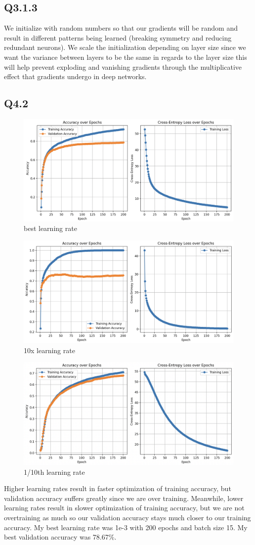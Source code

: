 \documentclass{article}
\begin{document}
\subsection*{Q3.1.3}
\begin{flushleft}
    We initialize with random numbers so that our gradients will be random and 
    result in different patterns being learned (breaking symmetry and reducing 
    redundant neurons). We scale the initialization 
    depending on layer size since we want the variance between layers to be the 
    same in regards to the layer size this will help prevent exploding and vanishing 
    gradients through the multiplicative effect that gradients undergo in deep 
    networks.
\end{flushleft}
\newpage
\subsection*{Q4.2}
\begin{figure}[htbp]
    \centering
    \includegraphics[width=0.4\linewidth]{best_lr.png}
    \caption{best learning rate}
  \end{figure}
  
  \begin{figure}[htbp]
    \centering
    \includegraphics[width=0.4\linewidth]{10x_lr.png}
    \caption{10x learning rate}
  \end{figure}
  
  \begin{figure}[htbp]
    \centering
    \includegraphics[width=0.4\linewidth]{tenth_lr.png}
    \caption{1/10th learning rate}
  \end{figure}
  Higher learning rates result in faster optimization of training accuracy,
  but validation accuracy suffers greatly since we are over training. Meanwhile,
  lower learning rates result in slower optimization of training accuracy,
  but we are not overtraining as much so our validation accuracy stays much closer 
  to our training accuracy. My best learning rate was 1e-3 with 200 epochs and batch 
  size 15. My best validation accuracy was 78.67\%.
\newpage
\end{document}
